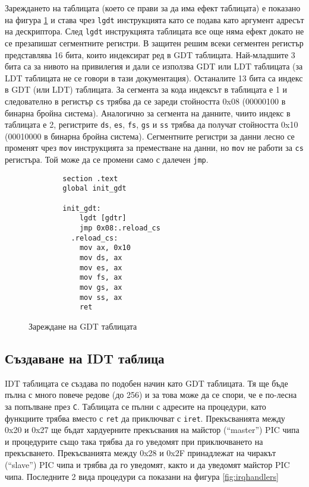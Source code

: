   Зареждането на таблицата (което се прави за да има ефект таблицата) е показано на фигура \ref{fig:lgdt} и става чрез {\tt lgdt} инструкцията като се подава като аргумент адресът на дескриптора. След {\tt lgdt} инструкцията таблицата все още няма ефект докато не се презапишат сегментните регистри. В защитен решим всеки сегментен регистър представлява 16 бита, които индексират ред в GDT таблицата. Най-младшите 3 бита са за нивото на привилегия и дали се използва GDT или LDT таблицата (за LDT таблицата не се говори в тази документация). Останалите 13 бита са индекс в GDT (или LDT) таблицата. За сегмента за кода индексът в таблицата е 1 и следователно в регистър {\tt cs} трябва да се зареди стойността 0x08 (00000100 в бинарна бройна система). Аналогично за сегмента на данните, чиито индекс в таблицата е 2, регистрите {\tt ds}, {\tt es}, {\tt fs}, {\tt gs} и {\tt ss} трябва да получат стойността 0x10 (00010000 в бинарна бройна система). Сегментните регистри за данни лесно се променят чрез {\tt mov} инструкцията за преместване на данни, но {\tt mov} не работи за {\tt cs} регистъра. Той може да се промени само с далечен {\tt jmp}.

    \begin{figure}[htpb]
      \centering
      \begin{verbatim}
        section .text
        global init_gdt

        init_gdt:
            lgdt [gdtr]
            jmp 0x08:.reload_cs
          .reload_cs:
            mov ax, 0x10
            mov ds, ax
            mov es, ax
            mov fs, ax
            mov gs, ax
            mov ss, ax
            ret
      \end{verbatim}
      \caption{Зареждане на GDT таблицата}
      \label{fig:lgdt}
    \end{figure}

  \subsection{Създаване на IDT таблица}
  IDT таблицата се създава по подобен начин като GDT таблицата. Тя ще бъде пълна с много повече редове (до 256) и за това може да се спори, че е по-лесна за попълване през {\tt C}. Таблицата се пълни с адресите на процедури, като функциите трябва вместо с {\tt ret} да приключват с {\tt iret}. Прекъсванията между 0x20 и 0x27 ще бъдат хардуерните прекъсвания на майстор (``master'') PIC чипа и процедурите също така трябва да го уведомят при приключването на прекъсването. Прекъсванията между 0x28 и 0x2F принадлежат на чиракът (``slave'') PIC чипа и трябва да го уведомят, както и да уведомят майстор PIC чипа. Последните 2 вида процедури са показани на фигура \ref{fig:irqhandlers}

